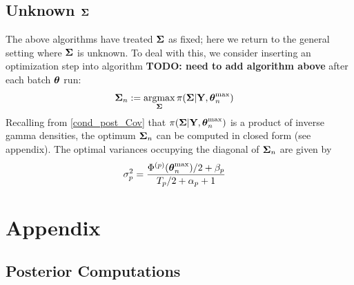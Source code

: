 \documentclass[12pt]{article}
\begin{document}
\subsection{Unknown $\boldsymbol{\Sigma}$}
The above algorithms have treated $\boldsymbol{\Sigma}$ as fixed; here we return to the general setting where $\boldsymbol{\Sigma}$ is unknown. To deal with this, we consider inserting an 
optimization step into algorithm \textbf{TODO: need to add algorithm above} after each batch $\boldsymbol{\theta}$ run:
\begin{align}
\boldsymbol{\Sigma}_{n} &:= \operatorname*{argmax}_{\boldsymbol{\Sigma}} \pi(\boldsymbol{\Sigma}|\mathbf{Y}, \boldsymbol{\theta}_{n}^{\text{max}}) \label{Cov_optimization}
\end{align}
Recalling from \ref{cond_post_Cov} that $\pi(\boldsymbol{\Sigma}|\mathbf{Y}, \boldsymbol{\theta}_{n}^{\text{max}})$ is a product of inverse gamma densities, the optimum $\boldsymbol{\Sigma}_{n}$ can 
be computed in closed form (see appendix). The optimal variances occupying the diagonal of $\boldsymbol{\Sigma}_{n}$ are given by 
\begin{align}
\sigma_{p}^2 &= \frac{\Phi^{(p)}(\boldsymbol{\theta}_{n}^{\text{max}})/2 + \beta_{p}}{T_{p}/2 + \alpha_{p} + 1}
\end{align}


\section{Appendix}

\subsection{Posterior Computations}
\end{document}
